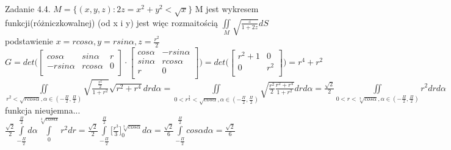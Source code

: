\documentclass{article}
\begin{document}
Zadanie 4.4.
\newline
\newline
$
M=\{(x,y,z):2z=x^2+y^2<\sqrt{x}\}
$
M jest wykresem funkcji(różniczkowalnej) (od x i y) jest więc rozmaitością
$
\iint\limits_{M}\sqrt{\frac{z}{1+2z}}dS
$
podstawienie
$
x=rcos\alpha,y=rsin\alpha,z=\frac{r^2}{2}
$\newline
$
G=det\bigl(
\left[\begin{array}{ccc}
cos\alpha&sin\alpha&r\\
-rsin\alpha&rcos\alpha&0\\
\end{array}\right]
\cdot
\left[\begin{array}{cc}
cos\alpha&-rsin\alpha\\
sin\alpha&rcos\alpha\\
r&0\\
\end{array}\right]
\bigr)
=
det\bigl(
\left[\begin{array}{cc}
r^2+1&0\\
0&r^2\\
\end{array}\right]
\bigr)
=r^4+r^2
$\newline
$
\iint\limits_{r^2<\sqrt{rcos\alpha},\alpha\in(-\frac{\Pi}{2},\frac{\Pi}{2})}\sqrt{\frac{\frac{r^2}{2}}{1+r^2}}\sqrt{r^2+r^4}drd\alpha
=
\iint\limits_{0<r^\frac{3}{2}<\sqrt{cos\alpha},\alpha\in(-\frac{\Pi}{2},\frac{\Pi}{2})}\sqrt{\frac{r^2}{2}\frac{r^2+r^4}{1+r^2}}drd\alpha
=
\frac{\sqrt{2}}{2}\iint\limits_{0<r<\sqrt[3]{cos\alpha},\alpha\in(-\frac{\Pi}{2},\frac{\Pi}{2})}r^2drd\alpha
$
funkcja nieujemna...
$
\frac{\sqrt{2}}{2}\int\limits_{-\frac{\Pi}{2}}^{\frac{\Pi}{2}}d\alpha\int\limits_{0}^{\sqrt[3]{cos\alpha}}r^2dr
=
\frac{\sqrt{2}}{2}\int\limits_{-\frac{\Pi}{2}}^{\frac{\Pi}{2}}\bigl[\frac{r^3}{3}\bigr]_{0}^{\sqrt[3]{cos\alpha}}d\alpha
=
\frac{\sqrt{2}}{6}\int\limits_{-\frac{\Pi}{2}}^{\frac{\Pi}{2}}cos\alpha d\alpha
=
\frac{\sqrt{2}}{6}
$
\newline
\newline
\end{document}
